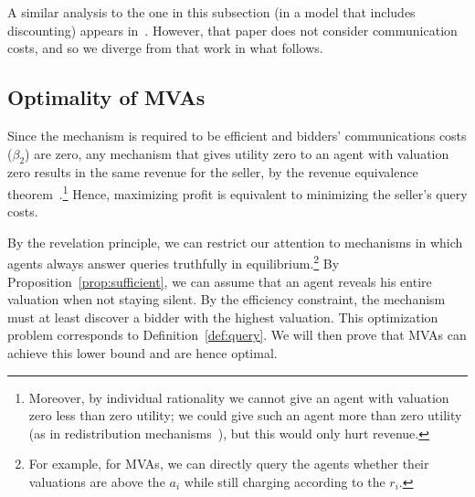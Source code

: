 A similar analysis to the one in this subsection (in a model that
includes discounting) appears in~\cite{McAfee97:SequentialAuctions}.  
However, that paper does not consider communication costs, and so we
diverge from that work in what follows.

\subsection{Optimality of MVAs}


Since the mechanism is required to be efficient and bidders' communications
costs ($\beta_2$) are zero, any mechanism that gives utility zero to an
agent with valuation zero results in the same revenue for the seller, by
the revenue equivalence theorem~\cite{Myerson:1981}.\footnote{Moreover, by
  individual rationality we cannot give an agent with valuation zero less
  than zero utility; we could give such an agent more than zero utility (as
  in redistribution mechanisms~\cite{}), but this would only hurt revenue.}
Hence, maximizing profit is equivalent to minimizing the seller's query
costs.

By the revelation principle, we can restrict our attention to mechanisms in
which agents always answer queries truthfully in equilibrium.\footnote{For
  example, for MVAs, we can directly query the agents whether their
  valuations are above the $a_i$ while still charging according to the
  $r_i$.}  By Proposition~\ref{prop:sufficient}, we can assume that an
agent reveals his entire valuation when not staying silent.  By the
efficiency constraint, the mechanism must at least discover a bidder with
the highest valuation.  This optimization problem corresponds to
Definition~\ref{def:query}.  We will then prove that MVAs can achieve this
lower bound and are hence optimal.


